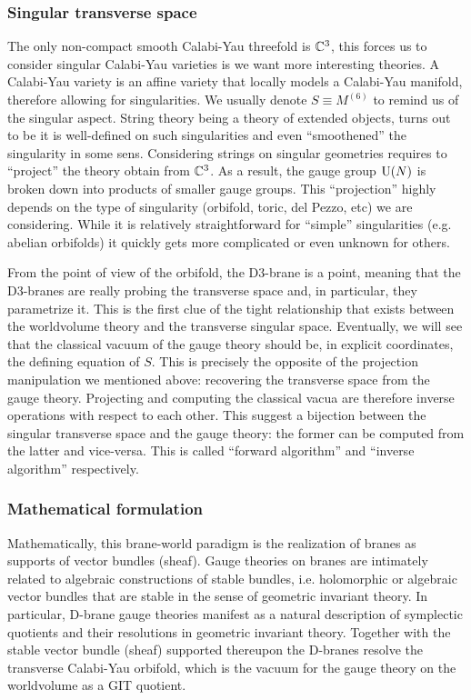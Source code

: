     \subsubsection*{Singular transverse space}

        The only non-compact smooth Calabi-Yau threefold is $\mathbb{C}^3$, this forces us to consider singular Calabi-Yau varieties is we want more interesting theories. A Calabi-Yau variety is an affine variety that locally models a Calabi-Yau manifold, therefore allowing for singularities. We usually denote $S\equiv M^{(6)}$ to remind us of the singular aspect. String theory being a theory of extended objects, turns out to be it is well-defined on such singularities and even ``smoothened'' the singularity in some sens. Considering strings on singular geometries requires to ``project'' the theory obtain from $\mathbb{C}^3$. As a result, the gauge group $\text{U}(N)$ is broken down into products of smaller gauge groups. This ``projection'' highly depends on the type of singularity (orbifold, toric, del Pezzo, etc) we are considering. While it is relatively straightforward for ``simple'' singularities (e.g. abelian orbifolds) it quickly gets more complicated or even unknown for others.
    
        From the point of view of the orbifold, the D$3$-brane is a point, meaning that the D$3$-branes are really probing the transverse space and, in particular, they parametrize it. This is the first clue of the tight relationship that exists between the worldvolume theory and the transverse singular space. Eventually, we will see that the classical vacuum of the gauge theory should be, in explicit coordinates, the defining equation of $S$. This is precisely the opposite of the projection manipulation we mentioned above: recovering the transverse space from the gauge theory. Projecting and computing the classical vacua are therefore inverse operations with respect to each other. This suggest a bijection between the singular transverse space and the gauge theory: the former can be computed from the latter and vice-versa. This is called ``forward algorithm'' and ``inverse algorithm'' respectively.

    \subsubsection*{Mathematical formulation}

        Mathematically, this brane-world paradigm is the realization of branes as supports of vector bundles (sheaf). Gauge theories on branes are intimately related to algebraic constructions of stable bundles, i.e. holomorphic or algebraic vector bundles that are stable in the sense of geometric invariant theory. In particular, D-brane gauge theories manifest as a natural description of symplectic quotients and their resolutions in geometric invariant theory. Together with the stable vector bundle (sheaf) supported thereupon the D-branes resolve the transverse Calabi-Yau orbifold, which is the vacuum for the gauge theory on the worldvolume as a GIT quotient.

